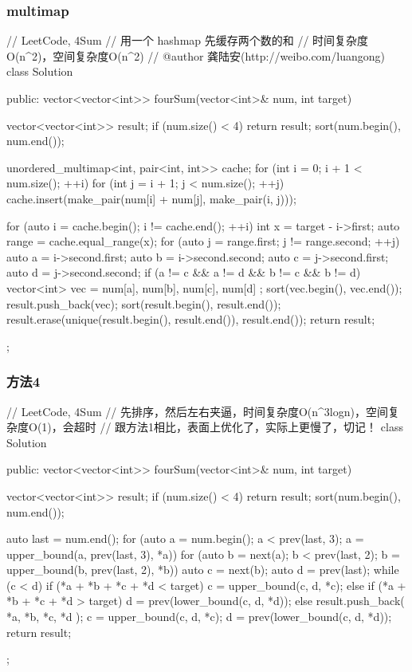 \subsubsection{multimap}
\begin{Code}
// LeetCode, 4Sum
// 用一个 hashmap 先缓存两个数的和
// 时间复杂度O(n^2)，空间复杂度O(n^2)
// @author 龚陆安(http://weibo.com/luangong)
class Solution {
public:
    vector<vector<int>> fourSum(vector<int>& num, int target) {
        vector<vector<int>> result;
        if (num.size() < 4) return result;
        sort(num.begin(), num.end());

        unordered_multimap<int, pair<int, int>> cache;
        for (int i = 0; i + 1 < num.size(); ++i)
            for (int j = i + 1; j < num.size(); ++j)
                cache.insert(make_pair(num[i] + num[j], make_pair(i, j)));

        for (auto i = cache.begin(); i != cache.end(); ++i) {
            int x = target - i->first;
            auto range = cache.equal_range(x);
            for (auto j = range.first; j != range.second; ++j) {
                auto a = i->second.first;
                auto b = i->second.second;
                auto c = j->second.first;
                auto d = j->second.second;
                if (a != c && a != d && b != c && b != d) {
                    vector<int> vec = { num[a], num[b], num[c], num[d] };
                    sort(vec.begin(), vec.end());
                    result.push_back(vec);
                }
            }
        }
        sort(result.begin(), result.end());
        result.erase(unique(result.begin(), result.end()), result.end());
        return result;
    }
};
\end{Code}


\subsubsection{方法4}
\begin{Code}
// LeetCode, 4Sum
// 先排序，然后左右夹逼，时间复杂度O(n^3logn)，空间复杂度O(1)，会超时
// 跟方法1相比，表面上优化了，实际上更慢了，切记！
class Solution {
public:
    vector<vector<int>> fourSum(vector<int>& num, int target) {
        vector<vector<int>> result;
        if (num.size() < 4) return result;
        sort(num.begin(), num.end());

        auto last = num.end();
        for (auto a = num.begin(); a < prev(last, 3);
                a = upper_bound(a, prev(last, 3), *a)) {
            for (auto b = next(a); b < prev(last, 2);
                    b = upper_bound(b, prev(last, 2), *b)) {
                auto c = next(b);
                auto d = prev(last);
                while (c < d) {
                    if (*a + *b + *c + *d < target) {
                        c = upper_bound(c, d, *c);
                    } else if (*a + *b + *c + *d > target) {
                        d = prev(lower_bound(c, d, *d));
                    } else {
                        result.push_back({ *a, *b, *c, *d });
                        c = upper_bound(c, d, *c);
                        d = prev(lower_bound(c, d, *d));
                    }
                }
            }
        }
        return result;
    }
};
\end{Code}


